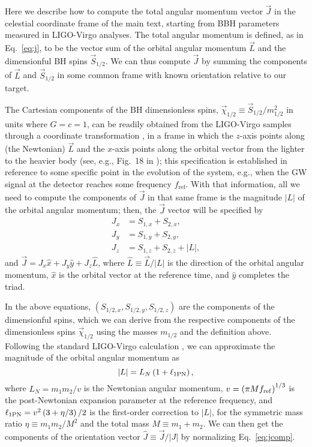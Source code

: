 \documentclass[aps,prd,twocolumn,superscriptaddress,preprintnumbers,floatfix,nofootinbib]{revtex4-2}
\begin{document}
Here we describe how to compute the total angular momentum vector $\vec{J}$ in the celestial coordinate frame of the main text, starting from \ac{BBH} parameters measured in LIGO-Virgo analyses.
The total angular momentum is defined, as in Eq.~\eqref{eq:j}, to be the vector sum of the orbital angular momentum $\vec{L}$ and the dimensionful \ac{BH} spins $\vec{S}_{1/2}$.
We can thus compute $\vec{J}$ by summing the components of $\vec{L}$ and $\vec{S}_{1/2}$ in some common frame with known orientation relative to our target.

The Cartesian components of the \ac{BH} dimensionless spins, $\vec{\chi}_{1/2} \equiv \vec{S}_{1/2} / m_{1/2}^2$ in units where $G=c=1$, can be readily obtained from the LIGO-Virgo samples through a coordinate transformation \cite{LALSuite:spins}, in a frame in which the $z$-axis points along (the Newtonian) $\vec{L}$ and the $x$-axis points along the orbital vector from the lighter to the heavier body (see, e.g., Fig.~18 in \cite{Isi:2022mbx}); this specification is established in reference to some specific point in the evolution of the system, e.g., when the \ac{GW} signal at the detector reaches some frequency $f_\mathrm{ref}$.
With that information, all we need to compute the components of $\vec{J}$ in that same frame is the magnitude $|L|$ of the orbital angular momentum; then, the $\vec{J}$ vector will be specified by
\begin{subequations}
\label{eq:jcomp}
\begin{align}
J_x &= S_{1,x} + S_{2,x}, \\
J_y &= S_{1,y} + S_{2,y}, \\
J_z &= S_{1,z} + S_{2,z} + |L|,
\end{align}
\end{subequations}
and $\vec{J} = J_x \hat{x} + J_y \hat{y} + J_z \hat{L}$, where $\hat{L} \equiv \vec{L}/|L|$ is the direction of the orbital angular momentum, $\hat{x}$ is the orbital vector at the reference time, and $\hat{y}$ completes the triad.

In the above equations, $(S_{1/2,x},S_{1/2,y},S_{1/2,z})$ are the components of the dimensionful spins, which we can derive from the respective components of the dimensionless spins $\vec{\chi}_{1/2}$ using the masses $m_{1/2}$ and the definition above. 
Following the standard LIGO-Virgo calculation \cite{LALSuite:spins}, we can approximate the magnitude of the orbital angular momentum as \cite{Kidder:1995zr,Bohe:2012mr}
\begin{equation}
|L| = L_N \left(1 + \ell_{\rm 1PN}\right),
\end{equation}
where $L_N = m_1 m_2 / v$ is the Newtonian angular momentum, $v = \left( \pi M f_{\rm ref} \right)^{1/3}$ is the post-Newtonian expansion parameter at the reference frequency, and $\ell_{\rm 1PN} = v^2 \left( 3 + \eta /3 \right)/2$ is the first-order correction to $|L|$, for the symmetric mass ratio $\eta \equiv m_1 m_2/M^2$ and the total mass $M \equiv m_1 + m_2$.
We can then get the components of the orientation vector $\hat{J} \equiv \vec{J} /|J|$ by normalizing Eq.~\eqref{eq:jcomp}.
\end{document}
